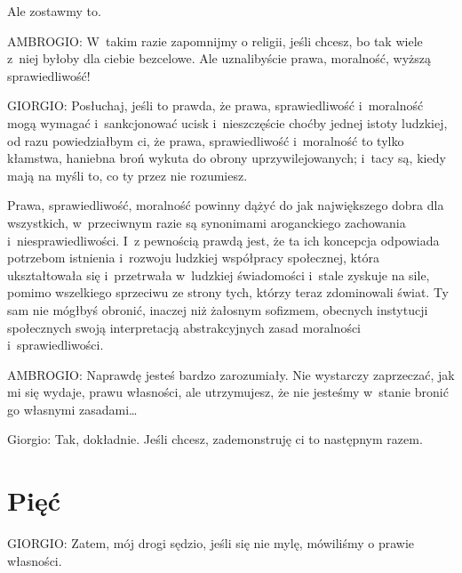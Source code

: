 \documentclass[oneside,polish,11pt,sfheadings]{mwbk}
\begin{document}
 
Ale zostawmy to. 




 
\noindent AMBROGIO: W~takim razie zapomnijmy o religii, jeśli chcesz, bo tak wiele z~niej byłoby dla ciebie bezcelowe. Ale
uznalibyście prawa, moralność, wyższą sprawiedliwość! 




 
\noindent GIORGIO: Posłuchaj, jeśli to prawda, że prawa, sprawiedliwość i~moralność mogą wymagać i~sankcjonować ucisk i~nieszczęście choćby jednej istoty ludzkiej, od razu powiedziałbym ci, że prawa, sprawiedliwość i~moralność to tylko
kłamstwa, haniebna broń wykuta do obrony uprzywilejowanych; i~tacy są, kiedy mają na myśli to, co ty przez nie
rozumiesz. 

 
Prawa, sprawiedliwość, moralność powinny dążyć do jak największego dobra dla wszystkich, w~przeciwnym razie są
synonimami aroganckiego zachowania i~niesprawiedliwości. I~z pewnością prawdą jest, że ta ich koncepcja odpowiada
potrzebom istnienia i~rozwoju ludzkiej współpracy społecznej, która ukształtowała się i~przetrwała w~ludzkiej
świadomości i~stale zyskuje na sile, pomimo wszelkiego sprzeciwu ze strony tych, którzy teraz zdominowali świat. Ty sam
nie mógłbyś obronić, inaczej niż żałosnym sofizmem, obecnych instytucji społecznych swoją interpretacją abstrakcyjnych
zasad moralności i~sprawiedliwości. 




 
\noindent AMBROGIO: Naprawdę jesteś bardzo zarozumiały. Nie wystarczy zaprzeczać, jak mi się wydaje, prawu własności, ale
utrzymujesz, że nie jesteśmy w~stanie bronić go własnymi zasadami\ldots 




 
Giorgio: Tak, dokładnie. Jeśli chcesz, zademonstruję ci to następnym razem. 










\chapter*{Pięć}



 
\noindent GIORGIO: Zatem, mój drogi sędzio, jeśli się nie mylę, mówiliśmy o prawie własności. 
\end{document}

